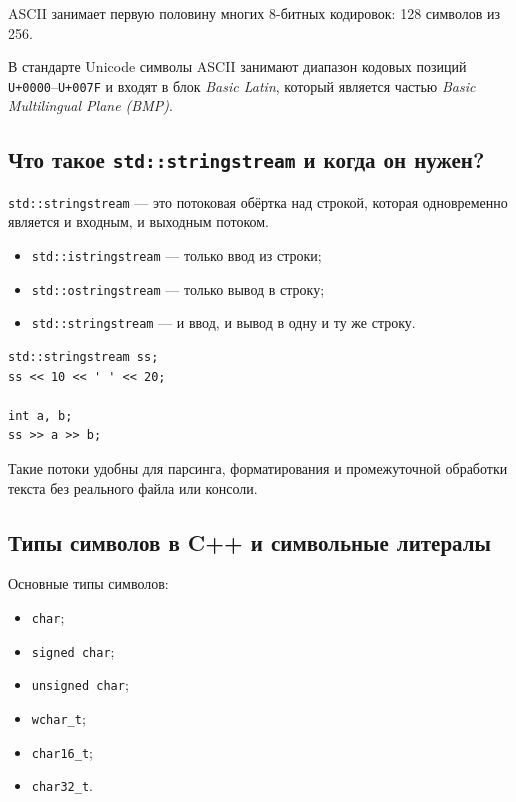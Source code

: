\begin{remark}
ASCII занимает первую половину многих 8-битных кодировок: 128 символов из 256.
\end{remark}

\begin{remark}
В стандарте Unicode символы ASCII занимают диапазон кодовых позиций
\texttt{U+0000}–\texttt{U+007F} и входят в блок \textit{Basic Latin},
который является частью \textit{Basic Multilingual Plane (BMP)}.
\end{remark}

\subsection{Что такое \texttt{std::stringstream} и когда он нужен?}
\texttt{std::stringstream} — это потоковая обёртка над строкой, которая одновременно является и входным, и выходным потоком.

\begin{itemize}
    \item \texttt{std::istringstream} — только ввод из строки;
    \item \texttt{std::ostringstream} — только вывод в строку;
    \item \texttt{std::stringstream} — и ввод, и вывод в одну и ту же строку.
\end{itemize}

\begin{example}
\begin{verbatim}
std::stringstream ss;
ss << 10 << ' ' << 20;

int a, b;
ss >> a >> b;
\end{verbatim}
\end{example}

Такие потоки удобны для парсинга, форматирования и промежуточной обработки текста без реального файла или консоли.

\subsection{Типы символов в C++ и символьные литералы}
Основные типы символов:
\begin{itemize}
    \item \texttt{char};
    \item \texttt{signed char};
    \item \texttt{unsigned char};
    \item \texttt{wchar\_t};
    \item \texttt{char16\_t};
    \item \texttt{char32\_t}.
\end{itemize}

